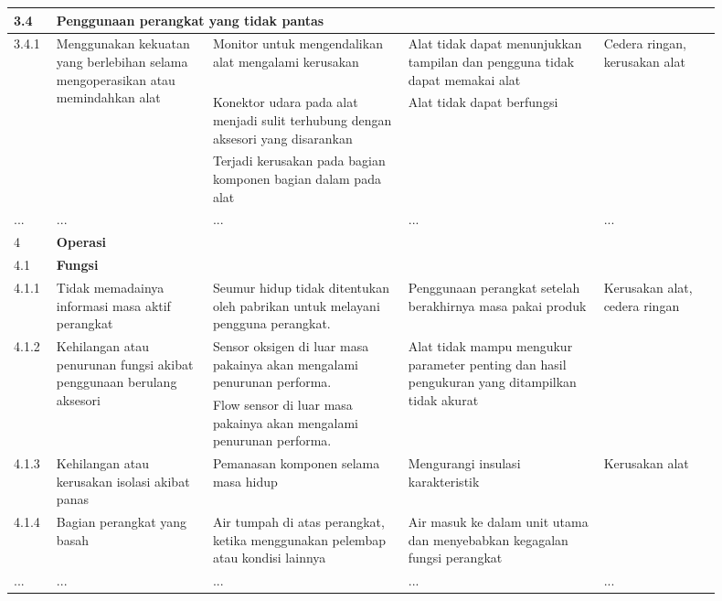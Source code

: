 \documentclass[11pt,a4paper,twoside,onecolumn]{book}
\begin{document}
\begin{longtable}{p{0.05\linewidth} p{0.20\linewidth} p{0.25\linewidth} p{0.25\linewidth} p{0.15\linewidth}}
				3.4 & \multicolumn{4}{l}{\textbf{Penggunaan perangkat yang tidak pantas}} \\
				\hline
				3.4.1 & \multirow{2}{\linewidth}{Menggunakan kekuatan 	yang berlebihan selama mengoperasikan atau memindahkan alat } & Monitor untuk mengendalikan alat mengalami kerusakan & Alat tidak dapat menunjukkan tampilan dan pengguna tidak dapat memakai alat & \multirow{3}{\linewidth}{Cedera ringan, kerusakan alat } \\\cline{3-4}
				&	& Konektor udara pada alat menjadi sulit terhubung dengan aksesori yang disarankan  & \multirow{2}{\linewidth}{Alat tidak dapat berfungsi}  & \\ \cline{3-3}
				&  & Terjadi kerusakan pada bagian komponen bagian dalam pada alat &  & \\ \cline{1-5}
				... & ... & ... & ... & ... \\ \hline
				
				\hline
				4 & \multicolumn{4}{l}{\textbf{Operasi} \cellcolor{cyan}} \\
				\hline
				4.1 & \multicolumn{4}{l}{\textbf{Fungsi}} \\
				\hline
				4.1.1 & Tidak  memadainya informasi masa aktif perangkat & Seumur hidup tidak ditentukan oleh pabrikan untuk melayani pengguna perangkat. & Penggunaan perangkat setelah berakhirnya masa pakai produk  & \multirow{3}{\linewidth}{Kerusakan alat, cedera ringan} \\
				\hline
				4.1.2 & \multirow{2}{\linewidth}{Kehilangan atau penurunan fungsi akibat penggunaan berulang aksesori} & Sensor oksigen di luar masa pakainya akan mengalami penurunan performa. & \multirow{2}{\linewidth}{Alat tidak mampu mengukur parameter penting dan hasil pengukuran yang ditampilkan tidak akurat } &  \\ \cline{3-3}
				 &  & Flow sensor di luar masa pakainya akan mengalami penurunan performa.  &  & \\
				\hline						
				4.1.3 & Kehilangan 	atau kerusakan 	isolasi akibat panas  & Pemanasan komponen selama masa hidup  & Mengurangi insulasi karakteristik  & \multirow{2}{\linewidth}{Kerusakan alat } \\
				\cline{1-4}
				4.1.4 & Bagian perangkat yang basah  & Air tumpah di atas perangkat, ketika menggunakan pelembap atau kondisi lainnya & Air masuk ke dalam unit utama dan menyebabkan kegagalan fungsi perangkat & \\ \cline{1-5}
				... & ... & ... & ... & ... \\ \hline
				

\end{longtable}
\end{document}
